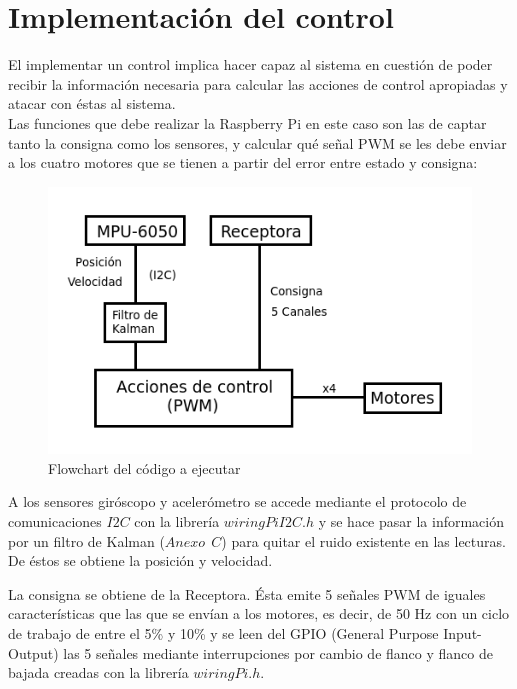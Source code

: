 \documentclass[twoside,11pt]{book}
\begin{document}
\newpage
\chapter{Implementación del control} \label{implement}

El implementar un control implica hacer capaz al sistema en cuestión de poder recibir la información necesaria para calcular las acciones de control apropiadas y atacar con éstas al sistema. \\

Las funciones que debe realizar la Raspberry Pi en este caso son las de captar tanto la consigna como los sensores, y calcular qué señal PWM se les debe enviar a los cuatro motores que se tienen a partir del error entre estado y consigna: 

\begin{figure}[h!]
\begin{center}
\includegraphics[scale=0.6,bb=0 0 300 230]{images/flowchart.png}
\caption{Flowchart del código a ejecutar}
\label{flowchart}
\end{center}
\end{figure}

A los sensores giróscopo y acelerómetro se accede mediante el protocolo de comunicaciones $I2C$ con la librería $wiringPiI2C.h$ y se hace pasar la información por un filtro de Kalman ($Anexo\>\>C$) para quitar el ruido existente en las lecturas. De éstos se obtiene la posición y velocidad.

La consigna se obtiene de la Receptora. Ésta emite 5 señales PWM de iguales características que las que se envían a los motores, es decir, de 50 Hz con un ciclo de trabajo de entre el 5\% y 10\% y se leen del GPIO (General Purpose Input-Output) las 5 señales mediante interrupciones por cambio de flanco y flanco de bajada creadas con la librería $wiringPi.h$.
\end{document}
